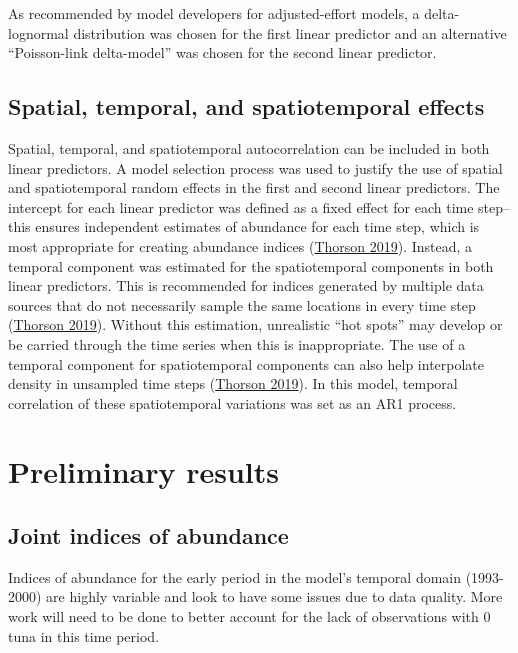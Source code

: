 \documentclass[
]{article}
\begin{document}
As recommended by model developers for adjusted-effort models, a delta-lognormal distribution was chosen for the first linear predictor and an alternative ``Poisson-link delta-model'' was chosen for the second linear predictor.

\hypertarget{spatial-temporal-and-spatiotemporal-effects}{%
\subsection{Spatial, temporal, and spatiotemporal effects}\label{spatial-temporal-and-spatiotemporal-effects}}

Spatial, temporal, and spatiotemporal autocorrelation can be included in both linear predictors. A model selection process was used to justify the use of spatial and spatiotemporal random effects in the first and second linear predictors. The intercept for each linear predictor was defined as a fixed effect for each time step-- this ensures independent estimates of abundance for each time step, which is most appropriate for creating abundance indices (\protect\hyperlink{ref-thorson_2019}{Thorson 2019}). Instead, a temporal component was estimated for the spatiotemporal components in both linear predictors. This is recommended for indices generated by multiple data sources that do not necessarily sample the same locations in every time step (\protect\hyperlink{ref-thorson_2019}{Thorson 2019}). Without this estimation, unrealistic ``hot spots'' may develop or be carried through the time series when this is inappropriate. The use of a temporal component for spatiotemporal components can also help interpolate density in unsampled time steps (\protect\hyperlink{ref-thorson_2019}{Thorson 2019}). In this model, temporal correlation of these spatiotemporal variations was set as an AR1 process.

\newpage

\hypertarget{preliminary-results}{%
\section{Preliminary results}\label{preliminary-results}}

\hypertarget{joint-indices-of-abundance}{%
\subsection{Joint indices of abundance}\label{joint-indices-of-abundance}}

Indices of abundance for the early period in the model's temporal domain (1993-2000) are highly variable and look to have some issues due to data quality. More work will need to be done to better account for the lack of observations with 0 tuna in this time period.
\end{document}
